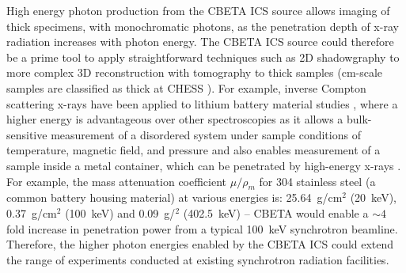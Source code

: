 \documentclass[../main.tex]{subfiles}
\begin{document}
High energy photon production from the CBETA ICS source allows imaging of thick specimens, with monochromatic photons, as the penetration depth of x-ray radiation increases with photon energy. The CBETA ICS source could therefore be a prime tool to apply straightforward techniques such as 2D shadowgraphy  to more complex 3D reconstruction with tomography \cite{als2011elements} to thick samples (\si{\centi\meter}-scale samples are classified as thick at CHESS \cite{miller2017insitmu}).  For example, inverse Compton scattering x-rays have been applied to lithium battery material studies \cite{suzuki2015extracting,suzuki2016non,suzuki2019high}, where a higher energy is advantageous over other spectroscopies as it
allows a bulk-sensitive measurement of a disordered system
under sample conditions of temperature, magnetic field,
and pressure and also enables measurement of a sample inside a metal
container, which can be penetrated by high-energy x-rays \cite{suzuki2015extracting}. For example, the mass attenuation coefficient $\mu/\rho_{m}$ for 304 stainless steel \cite{thyssenkrupp2021steel} (a common battery housing material) at various energies is: 25.64~\si{\gram}/\si{\centi\meter}$^{2}$ (20~\si{\kilo\electronvolt}), 0.37~\si{\gram}/\si{\centi\meter}$^{2}$ (100~\si{\kilo\electronvolt}) and 0.09~\si{\gram}/\si{\centimeter}$^{2}$ (402.5~\si{\kilo\electronvolt}) \cite{berger1999xcom} -- CBETA would enable a $\sim 4$ fold increase in penetration power from a typical 100~\si{\kilo\electronvolt} synchrotron beamline. Therefore, the higher photon energies enabled by the CBETA ICS could extend the range of experiments conducted at existing synchrotron radiation facilities.
\end{document}
